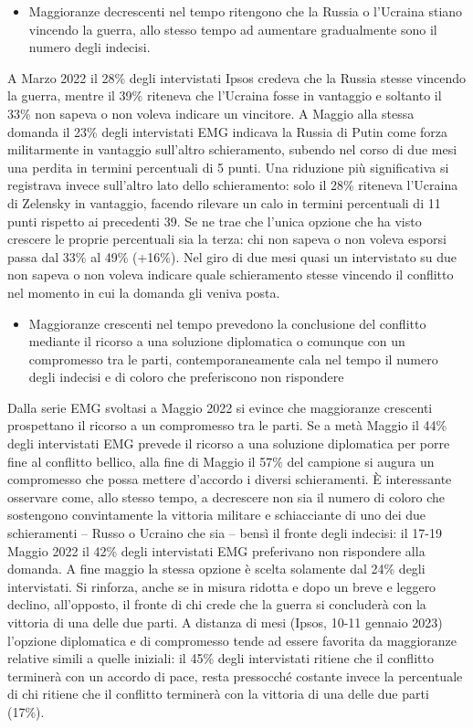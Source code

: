 \documentclass[
  openany]{book}
\providecommand{\tightlist}{%
  \setlength{\itemsep}{0pt}\setlength{\parskip}{0pt}}
\begin{document}
\begin{itemize}
\tightlist
\item
  Maggioranze decrescenti nel tempo ritengono che la Russia o l'Ucraina stiano vincendo la guerra, allo stesso tempo ad aumentare gradualmente sono il numero degli indecisi.
\end{itemize}

A Marzo 2022 il 28\% degli intervistati Ipsos credeva che la Russia stesse vincendo la guerra, mentre il 39\% riteneva che l'Ucraina fosse in vantaggio e soltanto il 33\% non sapeva o non voleva indicare un vincitore. A Maggio alla stessa domanda il 23\% degli intervistati EMG indicava la Russia di Putin come forza militarmente in vantaggio sull'altro schieramento, subendo nel corso di due mesi una perdita in termini percentuali di 5 punti. Una riduzione più significativa si registrava invece sull'altro lato dello schieramento: solo il 28\% riteneva l'Ucraina di Zelensky in vantaggio, facendo rilevare un calo in termini percentuali di 11 punti rispetto ai precedenti 39. Se ne trae che l'unica opzione che ha visto crescere le proprie percentuali sia la terza: chi non sapeva o non voleva esporsi passa dal 33\% al 49\% (+16\%). Nel giro di due mesi quasi un intervistato su due non sapeva o non voleva indicare quale schieramento stesse vincendo il conflitto nel momento in cui la domanda gli veniva posta.

\begin{itemize}
\tightlist
\item
  Maggioranze crescenti nel tempo prevedono la conclusione del conflitto mediante il ricorso a una soluzione diplomatica o comunque con un compromesso tra le parti, contemporaneamente cala nel tempo il numero degli indecisi e di coloro che preferiscono non rispondere
\end{itemize}

Dalla serie EMG svoltasi a Maggio 2022 si evince che maggioranze crescenti prospettano il ricorso a un compromesso tra le parti. Se a metà Maggio il 44\% degli intervistati EMG prevede il ricorso a una soluzione diplomatica per porre fine al conflitto bellico, alla fine di Maggio il 57\% del campione si augura un compromesso che possa mettere d'accordo i diversi schieramenti. È interessante osservare come, allo stesso tempo, a decrescere non sia il numero di coloro che sostengono convintamente la vittoria militare e schiacciante di uno dei due schieramenti -- Russo o Ucraino che sia -- bensì il fronte degli indecisi: il 17-19 Maggio 2022 il 42\% degli intervistati EMG preferivano non rispondere alla domanda. A fine maggio la stessa opzione è scelta solamente dal 24\% degli intervistati. Si rinforza, anche se in misura ridotta e dopo un breve e leggero declino, all'opposto, il fronte di chi crede che la guerra si concluderà con la vittoria di una delle due parti. A distanza di mesi (Ipsos, 10-11 gennaio 2023) l'opzione diplomatica e di compromesso tende ad essere favorita da maggioranze relative simili a quelle iniziali: il 45\% degli intervistati ritiene che il conflitto terminerà con un accordo di pace, resta pressocché costante invece la percentuale di chi ritiene che il conflitto terminerà con la vittoria di una delle due parti (17\%).
\end{document}
